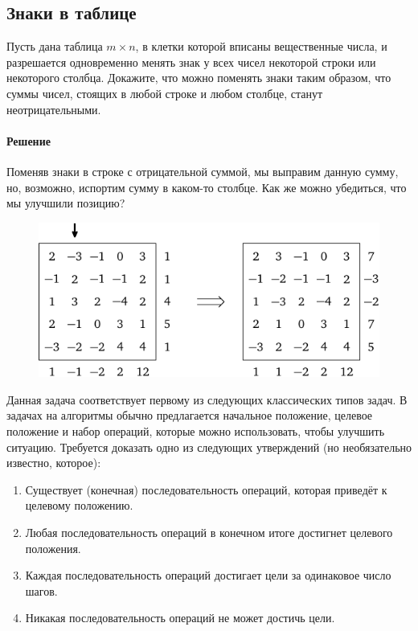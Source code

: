 \documentclass[twoside]{book}
\makeatletter
\newcommand{\rindex}[2][\imki@jobname]{%
  \index[#1]{\detokenize{#2}}%
}
\makeatother
\begin{document}
\subsection*{Знаки в таблице}%
\rindex{Знаки в таблице}

Пусть дана таблица $m\times n$, в клетки которой вписаны вещественные числа, и разрешается одновременно менять знак у всех чисел некоторой строки или некоторого столбца.
Докажите, что можно поменять знаки таким образом, что суммы чисел, стоящих в любой строке и любом столбце, станут неотрицательными.

\paragraph{Решение}
Поменяв знаки в строке с отрицательной суммой, мы выправим данную сумму, но, возможно, испортим сумму в каком-то столбце.
Как же можно убедиться, что мы улучшили позицию?

\begin{figure}
\centering
\includegraphics{mp/wink-16}
\end{figure}


Данная задача соответствует первому из следующих классических типов задач.
В задачах на алгоритмы обычно предлагается начальное положение, целевое положение и набор операций, которые можно использовать, чтобы улучшить ситуацию.
Требуется доказать одно из следующих утверждений (но необязательно известно, которое):
\begin{enumerate}[label=(\arabic*),noitemsep,leftmargin=\parindent,labelsep=3.5pt]
\item Существует (конечная) последовательность операций, которая приведёт к целевому положению.
\item Любая последовательность операций в конечном итоге достигнет целевого положения.
\item Каждая последовательность операций достигает цели за одинаковое число шагов.
\item Никакая последовательность операций не может достичь цели.
\end{enumerate}
\end{document}
